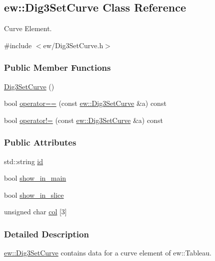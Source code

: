 \hypertarget{classew_1_1Dig3SetCurve}{
\subsection{ew::Dig3SetCurve Class Reference}
\label{classew_1_1Dig3SetCurve}
}


Curve Element.  




{\ttfamily \#include $<$ew/Dig3SetCurve.h$>$}

\subsubsection*{Public Member Functions}
\begin{DoxyCompactItemize}
\item 
\hyperlink{classew_1_1Dig3SetCurve_ac1f9c404a6534de970e2f3420a65adc2}{Dig3SetCurve} ()
\item 
bool \hyperlink{classew_1_1Dig3SetCurve_acaf106b1be917bae9aca68fd463c6596}{operator==} (const \hyperlink{classew_1_1Dig3SetCurve}{ew::Dig3SetCurve} \&a) const 
\item 
bool \hyperlink{classew_1_1Dig3SetCurve_a30f98f13b265d50a12ce79e046255f86}{operator!=} (const \hyperlink{classew_1_1Dig3SetCurve}{ew::Dig3SetCurve} \&a) const 
\end{DoxyCompactItemize}
\subsubsection*{Public Attributes}
\begin{DoxyCompactItemize}
\item 
std::string \hyperlink{classew_1_1Dig3SetCurve_a2e33ff75ce3983664e36a8ef6743cb87}{id}
\item 
bool \hyperlink{classew_1_1Dig3SetCurve_a863b47d06046cf374792227495b92fb0}{show\_\-in\_\-main}
\item 
bool \hyperlink{classew_1_1Dig3SetCurve_af653d84915b2581c139d6928c2943d00}{show\_\-in\_\-slice}
\item 
unsigned char \hyperlink{classew_1_1Dig3SetCurve_a92f3ffc02cb571c898a0f5af2ba6a096}{col} \mbox{[}3\mbox{]}
\end{DoxyCompactItemize}


\subsubsection{Detailed Description}
\hyperlink{classew_1_1Dig3SetCurve}{ew::Dig3SetCurve} contains data for a curve element of ew::Tableau.

